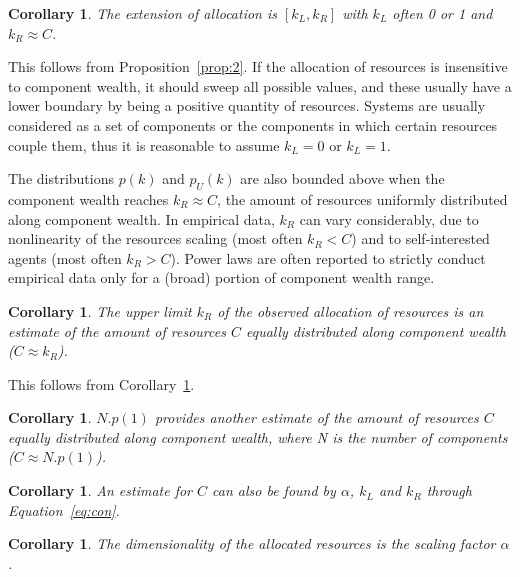 \documentclass[a4paper, 11pt]{article} %
\newtheorem{corollary}[theorem2]{Corollary}
\begin{document}
 \begin{corollary}\label{cor:2}
	The extension of allocation is $[k_L,k_R]$ with $k_L$ often 0 or 1 and $k_R\approx C$.
\end{corollary}

This follows from Proposition~\ref{prop:2}.
If the allocation of resources is insensitive to component wealth,
it should sweep all possible values, and these usually
have a lower boundary by being a positive quantity of resources.
Systems are usually considered as a set of components
or the components in which certain resources couple them,
thus it is reasonable to assume $k_L=0$ or $k_L=1$.

The distributions $p(k)$ and $p_U(k)$ are also
bounded above when the component wealth reaches $k_R \approx C$,
the amount of resources uniformly distributed along component wealth.
In empirical data, $k_R$ can vary considerably, due to
nonlinearity of the resources scaling (most often $k_R<C$) and
to self-interested agents (most often $k_R>C$).
Power laws are often reported to strictly conduct empirical data
only for a (broad) portion of component wealth range.


\begin{corollary}
	The upper limit $k_R$ of the observed allocation of resources is an estimate of the amount of resources $C$ equally distributed along component wealth ($C\approx k_R$).
\end{corollary}

This follows from Corollary~\ref{cor:2}.

\begin{corollary}
	$N . p(1)$ provides another estimate of the amount of resources $C$ equally distributed along component wealth, where N is the number of components ($C\approx N . p(1)$).
\end{corollary}

\begin{corollary}
	An estimate for $C$ can also be found by $\alpha$, $k_L$ and $k_R$ through Equation~\ref{eq:con}.
\end{corollary}

\begin{corollary}
	The dimensionality of the allocated resources is the scaling factor $\alpha$.
\end{corollary}
\end{document}
